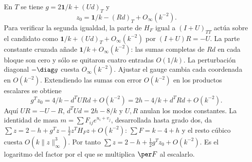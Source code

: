 En $T$ se tiene $g=2\mathbf1/k+(Ud)_T$ y
\[
 z_0=\mathbf1/k-(Rd)_T+O_\infty(k^{-2}).
\]
Para verificar la segunda igualdad, la parte de $H_F$ igual a $(I+U)_{TT}$
actúa sobre el candidato como $\mathbf1/k+(Ud)_T+O_\infty(k^{-2})$ por
$(I+U)R=-U$. La parte constante cruzada añade $\mathbf1/k+O_\infty(k^{-2})$:
las sumas completas de $Rd$ en cada bloque son cero y sólo se quitaron cuatro
entradas $O(1/k)$. La perturbación diagonal $-\diag g$ cuesta $O_\infty(k^{-2})$.
Ajustar el gauge cambia cada coordenada en $O(k^{-2})$. Extendiendo las sumas
con error $O(k^{-2})$ en los productos escalares se obtiene
\[
 g^Tz_0=4/k-d^TURd+O(k^{-2})=2h-4/k+d^TRd+O(k^{-2}).
\]
Aquí $UR=-U-R$, $d^TUd=2h-8/k$ y $U,R$ anulan los modos constantes.
La identidad de masa $m=\sum F_{ij}e^{u_i+v_j}$, desarrollada hasta grado dos,
da $\sum z=2-h+g^Tz-\tfrac12 z^T H_F z+O(k^{-2})$:
$\sum F=k-4+h$ y el resto cúbico cuesta $O(k\|z\|_\infty^3)$.
Por tanto $\sum z=2-h+\tfrac12g^Tz_0+O(k^{-2})$. Es el logaritmo del factor
por el que se multiplica $\per F$ al escalarlo.
